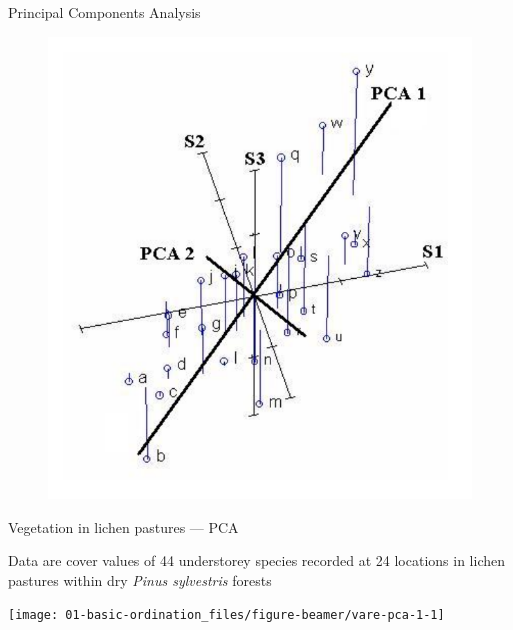 \documentclass[10pt,ignorenonframetext,compress, aspectratio=169]{beamer}
\begin{document}
\begin{frame}{Principal Components Analysis}

\begin{figure}[htbp]
\centering
\includegraphics{pca_example_figure.pdf}
\caption{}
\end{figure}

\end{frame}

\begin{frame}{Vegetation in lichen pastures --- PCA}

Data are cover values of 44 understorey species recorded at 24 locations
in lichen pastures within dry \emph{Pinus sylvestris} forests

\begin{center}\texttt{[image: 01-basic-ordination\_files/figure-beamer/vare-pca-1-1]} \end{center}

\end{frame}
\end{document}
